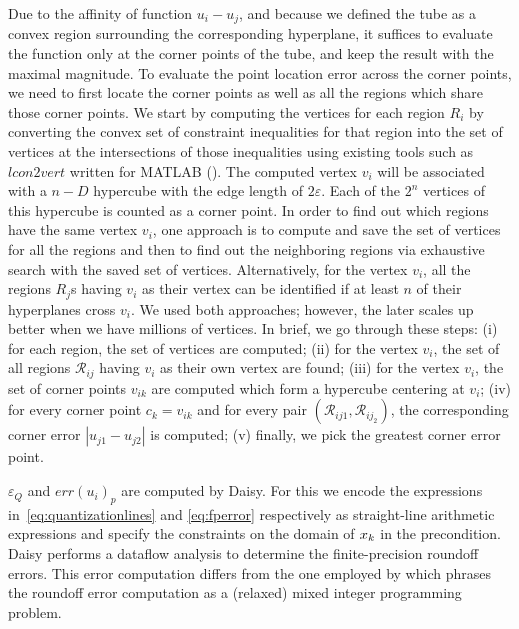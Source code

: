 Due to the affinity of function
$u_{i}-u_{j}$, and because we defined the tube as a convex region surrounding the corresponding hyperplane, it suffices
to evaluate the function only at the corner points of the tube, and keep the
result with the maximal magnitude. To evaluate the point location error across the corner points, we need to first locate the corner points as well as all the regions which share those corner points. We start by computing the vertices for each region $R_i$ by converting the convex set of constraint inequalities for that region into the set of vertices at the intersections of those inequalities using existing tools such as $\mathit{lcon2vert}$ written for MATLAB (\cite{????}). The computed vertex $v_i$ will be associated with a $n-D$ hypercube with the edge length of $2 \varepsilon$. Each of the $2^n$ vertices of this hypercube is counted as a corner point. In order to find out which regions have the same vertex $v_i$, one approach is to compute and save the set of vertices for all the regions and then to find out the neighboring regions via exhaustive search with the saved set of vertices. Alternatively, for the vertex $v_i$, all the regions $R_j$s having $v_i$ as their vertex can be identified if at least $n$ of their hyperplanes cross $v_i$. We used both approaches; however, the later scales up better when we have millions of vertices. In brief, we go through these steps: (i) for each region, the set of vertices are computed; (ii) for the vertex $v_i$, the set of all regions $\mathcal R_{ij}$ having $v_i$ as their own vertex are found; (iii) for the vertex $v_i$, the set of corner points $v_{ik}$ are computed which form a hypercube centering at $v_i$; (iv) for every corner point $c_k=v_{ik}$ and for every pair $(\mathcal R_{ij1},\mathcal R_{ij_2})$, the corresponding corner error $|u_{j1}-u_{j2}|$ is computed; (v) finally, we pick the greatest corner error point.



$\varepsilon_Q$ and $err(u_{i})_{p}$ are computed by Daisy. For this we encode
the expressions in~\autoref{eq:quantizationlines} and \autoref{eq:fperror}
respectively as straight-line arithmetic expressions and specify the constraints
on the domain of $x_{k}$ in the precondition.
Daisy performs a dataflow analysis to determine the finite-precision roundoff
errors. This error computation differs from the one employed by
\citet{imperialrmpc} which phrases the roundoff error computation as a (relaxed)
mixed integer programming problem.

